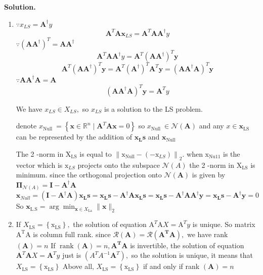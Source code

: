 \documentclass[english,onecolumn]{IEEEtran}
\begin{document}
\noindent
\textbf{Solution.}
\begin{enumerate}
	\item 
	$\because x_{L S}=\textbf{A}^{\dagger} y$
	$$
	\mathbf{A}^{T} \mathbf{Ax}_{LS} = \mathbf{A}^{T} \mathbf{A} \mathbf{A}^{\dagger} y
	$$
	$\because \left(\mathbf{AA}^{\dagger}\right)^{T}=\mathbf{AA}^{\dagger}$
	$$
	\mathbf{A}^{T} \mathbf{A} \mathbf{A}^{\dagger} y = \mathbf{A}^{T}\left(\mathbf{A} \mathbf{A}^{\dagger}\right)^{T} \mathbf{y}
	$$
$$
\mathbf{A}^{T}\left(\mathbf{A} \mathbf{A}^{\dagger}\right)^{T} \mathbf{y}=\mathbf{A}^{T}\left(\mathbf{A}^{\dagger}\right)^{T} \mathbf{A}^{T} \mathbf{y}=\left(\mathbf{A A}^{\dagger} \textbf{A}\right)^{T} \mathbf{y}
$$
	$\because \textbf{A}\textbf{A}^{\dagger} \textbf{A}=\textbf{A}$
$$
\left(\mathbf{A A}^{\dagger} \textbf{A}\right)^{T} \mathbf{y} = \mathbf{A}^{T} y
$$
	
	We have $x_{L S} \in X_{L S},$ so $x_{L S}$ is a solution to the LS problem.
	
	denote $x_{\text {Null }}=\left\{\mathbf{x} \in \mathbb{R}^{n} \mid \mathbf{A}^{T} \mathbf{A} \mathbf{x}=0\right\}$ so $x_{\text {Null }} \in \mathcal{N}(\mathbf{A})$ and any $x \in \mathbf{x}_{\text {LS }}$ can be represented by the addition of $\mathbf{x}_{\mathbf{L}} \mathbf{s}$ and $\mathbf{x}_{\text {Null }}$
	
	The 2 -norm in $\mathrm{X}_{\mathrm{LS}}$ is equal to $\left\|\mathrm{x}_{\mathrm{Null}}-\left(-\mathrm{x}_{L S}\right)\right\|_{2}$. when $\mathrm{x}_{\mathrm{Nu} 11}$ is the vector which is $\mathrm{x}_{L S}$ projects onto
	the subspace $\mathcal{N}(A)$ the 2 -norm in $\mathrm{X}_{\mathrm{LS}}$ is minimum. since the orthogonal projection onto $\mathcal{N}(\mathbf{A})$ is given by $\mathbf{\Pi}_{\mathcal{N}(A)}=\mathbf{I}-\mathbf{A}^{\dagger} \mathbf{A}$
	$$
	\mathbf{x}_{N u l l}=\left(\mathbf{I}-\mathbf{A}^{\dagger} \mathbf{A}\right) \mathbf{x}_{\mathbf{L}} \mathbf{s}=\mathbf{x}_{\mathbf{L}} \mathbf{s}-\mathbf{A}^{\dagger} \mathbf{A} \mathbf{x}_{\mathbf{L}} \mathbf{s}=\mathbf{x}_{\mathbf{L}} \mathbf{s}-\mathbf{A}^{\dagger} \mathbf{A} \mathbf{A}^{\dagger} \mathbf{y}=\mathbf{x}_{\mathbf{L}} \mathbf{s}-\mathbf{A}^{\dagger} \mathbf{y}=0
	$$
	So $\mathbf{x}_{\mathrm{L} . \mathrm{S}}=\arg \min _{\mathbf{x} \in X_{\mathrm{La}}}\|\mathbf{x}\|_{2}$
	\item  If $X_{\mathrm{LS}}=\left\{\mathrm{x}_{\mathrm{LS}}\right\},$ the solution of equation $\mathrm{A}^{T} \mathrm{A} X=\mathrm{A}^{T} y$ is unique. So matrix $\mathrm{A}^{\mathrm{T}} \mathrm{A}$ is column full rank.
	since $\mathcal{R}(\mathbf{A})=\mathcal{R}\left(\mathbf{A}^{\mathbf{T}} \mathbf{A}\right),$ we have rank $(\mathbf{A})=n$
	If $\operatorname{rank}(\mathbf{A})=n, \mathbf{A}^{\mathbf{T}} \mathbf{A}$ is invertible, the solution of equation $\mathbf{A}^{T} \mathbf{A} X=\mathbf{A}^{T} y$ just is $\left(A^{T} A^{-1} \mathbf{A}^{T}\right),$ so the
	solution is unique, it means that $X_{\mathrm{LS}}=\left\{\mathrm{x}_{\mathrm{LS}}\right\}$
	Above all, $X_{\mathrm{LS}}=\left\{\mathrm{x}_{\mathrm{LS}}\right\}$ if and only if rank $(\mathbf{A})=n$
	
\end{enumerate}
\end{document}
